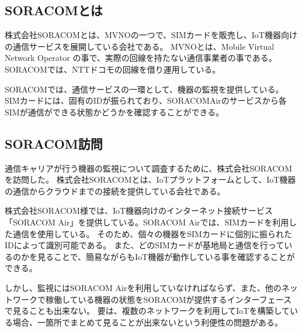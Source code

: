 

\subsection{SORACOMとは}
株式会社SORACOMとは、MVNOの一つで、SIMカードを販売し、IoT機器向けの通信サービスを展開している会社である。
MVNOとは、Mobile Virtual Network Operator の事で、実際の回線を持たない通信事業者の事である。
SORACOMでは、NTTドコモの回線を借り運用している。

SORACOMでは、通信サービスの一環として、機器の監視を提供している。
SIMカードには、固有のIDが振られており、SORACOMAirのサービスから各SIMが通信ができる状態かどうかを確認することができる。

\subsection{SORACOM訪問}


通信キャリアが行う機器の監視について調査するために、株式会社SORACOMを訪問した。
株式会社SORACOMとは、IoTプラットフォームとして、IoT機器の通信からクラウドまでの接続を提供している会社である。

株式会社SORACOM様では、IoT機器向けのインターネット接続サービス「SORACOM Air」を提供している。SORACOM Airでは、SIMカードを利用した通信を使用している。
そのため、個々の機器をSIMカードに個別に振られたIDによって識別可能である。
また、どのSIMカードが基地局と通信を行っているのかを見ることで、簡易ながらもIoT機器が動作している事を確認することができる。

しかし、監視にはSORACOM Airを利用していなければならず、また、他のネットワークで稼働している機器の状態をSORACOMが提供するインターフェースで見ることも出来ない。
要は、複数のネットワークを利用してIoTを構築している場合、一箇所でまとめて見ることが出来ないという利便性の問題がある。


